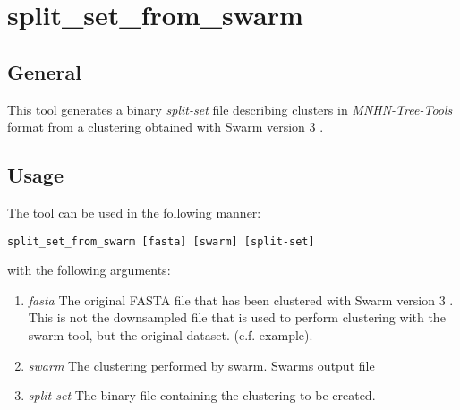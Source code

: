 \section{split\_set\_from\_swarm} \label{sec-ssswarm}

\subsection{General}

This tool generates a binary \emph{split-set} file describing
clusters in \emph{MNHN-Tree-Tools} format from a clustering obtained
with Swarm version 3 \cite{swarm2}.

\subsection{Usage}
The tool can be used in the following manner:
\begin{lstlisting}
split_set_from_swarm [fasta] [swarm] [split-set]
\end{lstlisting}
with the following arguments:
\begin{enumerate}
  \item \emph{fasta} The original FASTA file that has been clustered with Swarm
    version 3 \cite{swarm2}. This is not the downsampled file that is
    used to perform clustering with the swarm tool, but the original dataset.
    (c.f. example).
  \item \emph{swarm} The clustering performed by swarm. Swarms output
    file
  \item \emph{split-set} The binary file containing the clustering to
    be created.
\end{enumerate}

